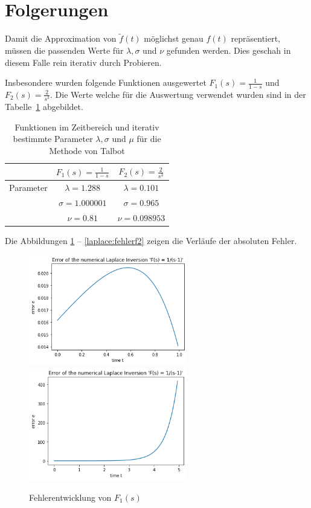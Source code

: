 %
%

\section{Folgerungen
\label{laplace:section:folgerungen}}
Damit die Approximation von $\tilde{f}(t)$ möglichst genau $f(t)$ repräsentiert,
müssen die passenden Werte für $\lambda, \sigma $ und $\nu $ gefunden werden. 
Dies geschah in diesem Falle rein iterativ durch Probieren.

Insbesondere wurden folgende Funktionen ausgewertet $ F_{1}(s)=\frac{1}{1-s} $ und $F_{2}(s) = \frac{2}{s^{3}}$. 
Die Werte welche für die Auswertung verwendet wurden sind in der Tabelle~\ref{laplace:parametertabelle1} abgebildet.

\begin{table}
\centering
\begin{tabular}[c]{c|c|c}
& $F_{1}(s)=\frac{1}{1-s}$ & $F_{2}(s) = \frac{2}{s^{3}}$ \\
\hline
Parameter & $\lambda=1.288$ & $\lambda=0.101$ \\
& $\sigma=1.000001$ & $\sigma=0.965$ \\
& $\nu=0.81$ & $\nu=0.098953$ \\
\end{tabular}
\caption{Funktionen im Zeitbereich und iterativ bestimmte Parameter $\lambda, \sigma$ und $\mu$ für die Methode von Talbot
\label{laplace:parametertabelle1}}
\end{table}
Die Abbildungen \ref{laplace:fehlerf1} -- \ref{laplace:fehlerf2} zeigen die Verläufe der absoluten Fehler.

\begin{figure}
\centering
\includegraphics[width=6.9cm]{papers/laplace/Error_1divide_sminus1}
\includegraphics[width=6.9cm]{papers/laplace/Error_1divide_sminus1_bis_tgleich5}
\caption{Fehlerentwicklung von $F_{1}(s)$
\label{laplace:fehlerf1}
}
\end{figure}

